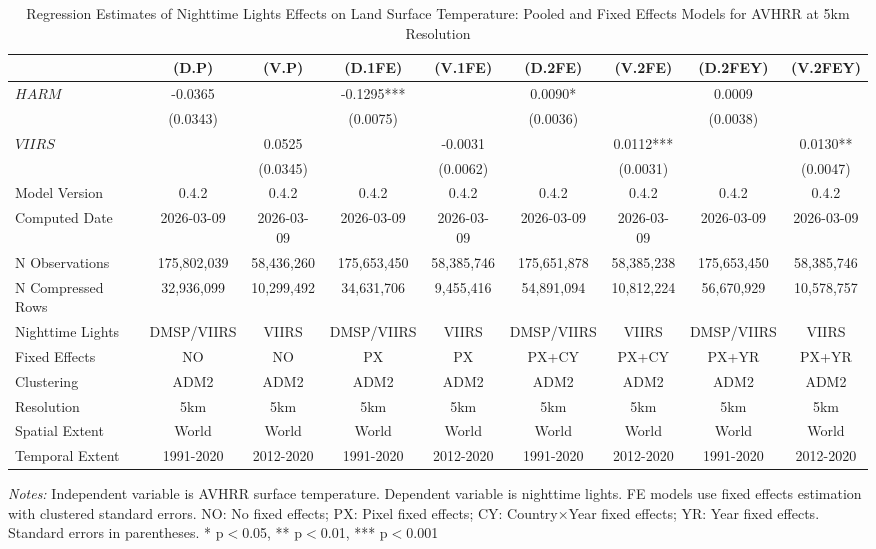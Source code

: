 \begin{table}[htbp]
\centering
\footnotesize
\caption{Regression Estimates of Nighttime Lights Effects on Land Surface Temperature: Pooled and Fixed Effects Models for AVHRR at 5km Resolution}
\begin{tabular}{lcccccccc}
\toprule
 & (D.P) & (V.P) & (D.1FE) & (V.1FE) & (D.2FE) & (V.2FE) & (D.2FEY) & (V.2FEY) \\
\midrule
$HARM$ & -0.0365 &  & -0.1295*** &  & 0.0090* &  & 0.0009 &  \\
 & (0.0343) &  & (0.0075) &  & (0.0036) &  & (0.0038) &  \\
$VIIRS$ &  & 0.0525 &  & -0.0031 &  & 0.0112*** &  & 0.0130** \\
 &  & (0.0345) &  & (0.0062) &  & (0.0031) &  & (0.0047) \\
\midrule
Model Version & 0.4.2 & 0.4.2 & 0.4.2 & 0.4.2 & 0.4.2 & 0.4.2 & 0.4.2 & 0.4.2 \\
Computed Date & 2026-03-09 & 2026-03-09 & 2026-03-09 & 2026-03-09 & 2026-03-09 & 2026-03-09 & 2026-03-09 & 2026-03-09 \\
N Observations & 175,802,039 & 58,436,260 & 175,653,450 & 58,385,746 & 175,651,878 & 58,385,238 & 175,653,450 & 58,385,746 \\
N Compressed Rows & 32,936,099 & 10,299,492 & 34,631,706 & 9,455,416 & 54,891,094 & 10,812,224 & 56,670,929 & 10,578,757 \\
\midrule
Nighttime Lights & DMSP/VIIRS & VIIRS & DMSP/VIIRS & VIIRS & DMSP/VIIRS & VIIRS & DMSP/VIIRS & VIIRS \\
Fixed Effects & NO & NO & PX & PX & PX+CY & PX+CY & PX+YR & PX+YR \\
Clustering & ADM2 & ADM2 & ADM2 & ADM2 & ADM2 & ADM2 & ADM2 & ADM2 \\
Resolution & 5km & 5km & 5km & 5km & 5km & 5km & 5km & 5km \\
Spatial Extent & World & World & World & World & World & World & World & World \\
Temporal Extent & 1991-2020 & 2012-2020 & 1991-2020 & 2012-2020 & 1991-2020 & 2012-2020 & 1991-2020 & 2012-2020 \\
\bottomrule
\end{tabular}
\begin{threeparttable}
\begin{tablenotes}\small
\item \textit{Notes:} Independent variable is AVHRR surface temperature. Dependent variable is nighttime lights. FE models use  fixed effects estimation with clustered standard errors. NO: No fixed effects; PX: Pixel fixed effects; CY: Country×Year fixed effects; YR: Year fixed effects. Standard errors in parentheses. * p$<$0.05, ** p$<$0.01, *** p$<$0.001
\end{tablenotes}
\end{threeparttable}
\end{table}